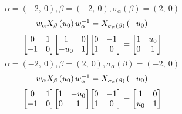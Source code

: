 \documentclass[11pt]{article}
\theoremstyle{definition}
\begin{document}
\providecommand{\scaletoalign}[2]{%
  \sbox0{$#2$}%
  \ifdim\wd0>#1\relax 
    \resizebox{#1}{!}{\usebox0}%
  \else 
    \usebox0%
  \fi 
}
\[
\alpha = \left( -2, \  0\right), \beta = \left( -2, \  0\right), \sigma_{\alpha}(\beta) = \left( 2, \  0\right)
\]
\[
\scaletoalign{\textwidth}{w_{\alpha} X_{\beta}\left(u_{0}\right) w_{\alpha}^{-1} = X_{\sigma_{\alpha}\left(\beta\right)}\left(- u_{0}\right)}
\]
\[
\scaletoalign{\textwidth}{{\left[\begin{matrix}0 & 1\\-1 & 0\end{matrix}\right]} {\left[\begin{matrix}1 & 0\\- u_{0} & 1\end{matrix}\right]} {\left[\begin{matrix}0 & -1\\1 & 0\end{matrix}\right]} = {\left[\begin{matrix}1 & u_{0}\\0 & 1\end{matrix}\right]}}
\]
\[
\alpha = \left( -2, \  0\right), \beta = \left( 2, \  0\right), \sigma_{\alpha}(\beta) = \left( -2, \  0\right)
\]
\[
\scaletoalign{\textwidth}{w_{\alpha} X_{\beta}\left(u_{0}\right) w_{\alpha}^{-1} = X_{\sigma_{\alpha}\left(\beta\right)}\left(- u_{0}\right)}
\]
\[
\scaletoalign{\textwidth}{{\left[\begin{matrix}0 & 1\\-1 & 0\end{matrix}\right]} {\left[\begin{matrix}1 & - u_{0}\\0 & 1\end{matrix}\right]} {\left[\begin{matrix}0 & -1\\1 & 0\end{matrix}\right]} = {\left[\begin{matrix}1 & 0\\u_{0} & 1\end{matrix}\right]}}
\]
\end{document}
